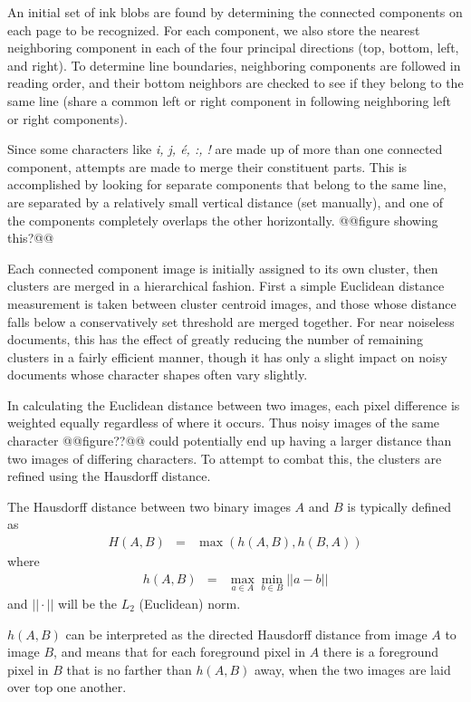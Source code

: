 \documentclass[times, 10pt,twocolumn]{article}
\begin{document}
An initial set of ink blobs are found by determining the connected components
on each page to be recognized.  For each component, we also store the nearest
neighboring component in each of the four principal directions (top, bottom, 
left, and right).  To determine line boundaries, neighboring components are 
followed in reading order, and their bottom neighbors are checked to see if 
they belong to the same line (share a common left or right component in
following neighboring left or right components).

Since some characters like {\em i, j, \'{e}, :, !} are made up of more than one
connected component, attempts are made to merge their constituent parts.  This 
is accomplished by looking for separate components that belong to the same line,
are separated by a relatively small vertical distance (set manually), and one
of the components completely overlaps the other horizontally.  @@figure showing
this?@@

Each connected component image is initially assigned to its own cluster, then
clusters are merged in a hierarchical fashion.  First a simple Euclidean
distance measurement is taken between cluster centroid images, and those whose
distance falls below a conservatively set threshold are merged together.  For
near noiseless documents, this has the effect of greatly reducing the number of
remaining clusters in a fairly efficient manner, though it has only a slight
impact on noisy documents whose character shapes often vary slightly.

In calculating the Euclidean distance between two images, each pixel difference
is weighted equally regardless of where it occurs.  Thus noisy images
of the same character @@figure??@@ could potentially end up having a larger
distance than two images of differing characters.  To attempt to combat this, 
the clusters are refined using the Hausdorff distance\cite{rucklidge1996}.  

The Hausdorff distance between two binary images $A$ and $B$ is typically 
defined as
\begin{eqnarray}
H(A,B) & = & \max(h(A,B), h(B,A))
\end{eqnarray}
where
\begin{eqnarray}
h(A,B) & = & \max_{a \in A} \min_{b \in B} || a - b ||
\end{eqnarray}
and $|| \cdot ||$ will be the $L_2$ (Euclidean) norm.

$h(A,B)$ can be interpreted as the directed Hausdorff distance from image $A$ to
image $B$, and means that for each foreground pixel in $A$ there is a foreground
pixel in $B$ that is no farther than $h(A,B)$ away, when the two images are 
laid over top one another.
\end{document}
